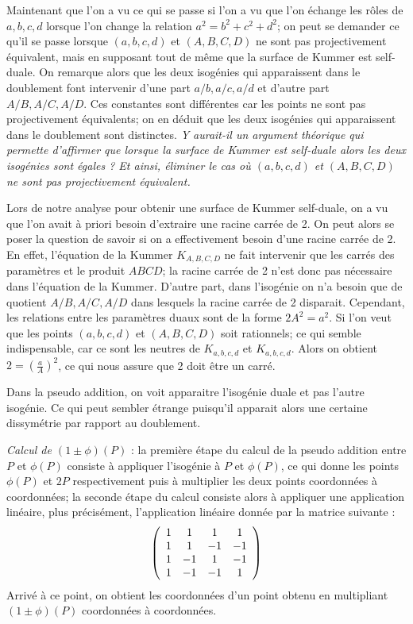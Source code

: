 \documentclass[a4paper]{article}
\theoremstyle{definition}
\theoremstyle{remark}
\numberwithin{equation}{section}
\begin{document}
Maintenant que l'on a vu ce qui se passe si l'on a vu que l'on échange les rôles de $a,b,c,d$ lorsque l'on change la relation $a^2 = b^2 + c^2 + d^2$; on peut se demander ce qu'il se passe lorsque $(a,b,c,d)$ et $(A,B,C,D)$ ne sont pas projectivement équivalent, mais en supposant tout de même que la surface de Kummer est self-duale. On remarque alors que les deux isogénies qui apparaissent dans le doublement font intervenir d'une part $a/b,a/c,a/d$ et d'autre part $A/B,A/C,A/D$. Ces constantes sont différentes car les points ne sont pas projectivement équivalents; on en déduit que les deux isogénies qui apparaissent dans le doublement sont distinctes. \emph{Y aurait-il un argument théorique qui permette d'affirmer que lorsque la surface de Kummer est self-duale alors les deux isogénies sont égales ? Et ainsi, éliminer le cas où $(a,b,c,d)$ et $(A,B,C,D)$ ne sont pas projectivement équivalent.}

Lors de notre analyse pour obtenir une surface de Kummer self-duale, on a vu que l'on avait à priori besoin d'extraire une racine carrée de 2. On peut alors se poser la question de savoir si on a effectivement besoin d'une racine carrée de 2. En effet, l'équation de la Kummer $K_{A,B,C,D}$ ne fait intervenir que les carrés des paramètres et le produit $ABCD$; la racine carrée de 2 n'est donc pas nécessaire dans l'équation de la Kummer. D'autre part, dans l'isogénie on n'a besoin que de quotient $A/B,A/C,A/D$ dans lesquels la racine carrée de 2 disparait. Cependant, les relations entre les paramètres duaux sont de la forme $2A^2 = a^2$. Si l'on veut que les points $(a,b,c,d)$ et $(A,B,C,D)$ soit rationnels; ce qui semble indispensable, car ce sont les neutres de $K_{a,b,c,d}$ et $K_{a,b,c,d}$. Alors on obtient $2 = (\frac{a}{A})^2$, ce qui nous assure que 2 doit être un carré.

Dans la pseudo addition, on voit apparaitre l'isogénie duale et pas l'autre isogénie. Ce qui peut sembler étrange puisqu'il apparait alors une certaine dissymétrie par rapport au doublement.

\emph{Calcul de $(1 \pm \phi)(P)$} : la première étape du calcul de la pseudo addition entre $P$ et $\phi(P)$ consiste à appliquer l'isogénie à $P$ et $\phi(P)$, ce qui donne les points $\phi(P)$ et $2P$ respectivement puis à multiplier les deux points coordonnées à coordonnées; la seconde étape du calcul consiste alors à appliquer une application linéaire, plus précisément, l'application linéaire donnée par la matrice suivante :
\[ \left(
  \begin{array}{ c c c c}
     1 & 1 & 1 & 1\\
     1 & 1 & -1 & -1\\
     1 & -1 & 1 & -1\\
     1 & -1 & -1 & 1\\
  \end{array} \right)
\]
Arrivé à ce point, on obtient les coordonnées d'un point obtenu en multipliant $(1 \pm \phi)(P)$ coordonnées à coordonnées.
\end{document}
